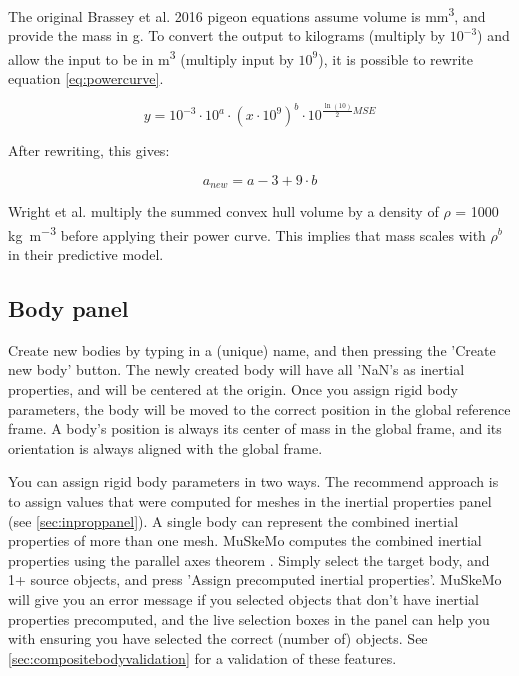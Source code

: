 \documentclass{article}
\begin{document}
The original Brassey et al. 2016 \cite{brasseyConvexhullMassEstimates2016} pigeon equations assume volume is  \si{mm^3}, and provide the mass in \si{g}. To convert the output to kilograms (multiply by \(10^{-3}\)) and allow the input to be in \si{m^3} (multiply input by \(10^9\)), it is possible to rewrite equation \ref{eq:powercurve}.

\begin{equation}
y = 10^{-3} \cdot 10^a \cdot (x \cdot 10^9 )^{b} \cdot 10^{\frac{\ln(10)}{2} MSE }
\end{equation}

After rewriting, this gives:

\begin{equation}
    a_{new} = a - 3 + 9\cdot b
\end{equation}

Wright et al. \cite{wrightVolumetricElementscalingMass2024} multiply the summed convex hull volume by a density of \(\rho\) = 1000 \si{kg m^{-3}} before applying their power curve. This implies that mass scales with \(\rho^b\) in their predictive model.




\subsection{Body panel}
\label{sec:bodypanel}

Create new bodies by typing in a (unique) name, and then pressing the 'Create new body' button. The newly created body will have all 'NaN's as inertial properties, and will be centered at the origin. Once you assign rigid body parameters, the body will be moved to the correct position in the global reference frame. A body's position is always its center of mass in the global frame, and its orientation is always aligned with the global frame.

You can assign rigid body parameters in two ways. The recommend approach is to assign values that were computed for meshes in the inertial properties panel (see \ref{sec:inproppanel}). A single body can represent the combined inertial properties of more than one mesh. MuSkeMo computes the combined inertial properties using the parallel axes theorem \cite{valleryAdvancedDynamics2019,ruinaMechanicsToolsetStatics2019}. Simply select the target body, and 1+ source objects, and press 'Assign precomputed inertial properties'. MuSkeMo will give you an error message if you selected objects that don't have inertial properties precomputed, and the live selection boxes in the panel can help you with ensuring you have selected the correct (number of) objects. See \ref{sec:compositebodyvalidation} for a validation of these features.
\end{document}

